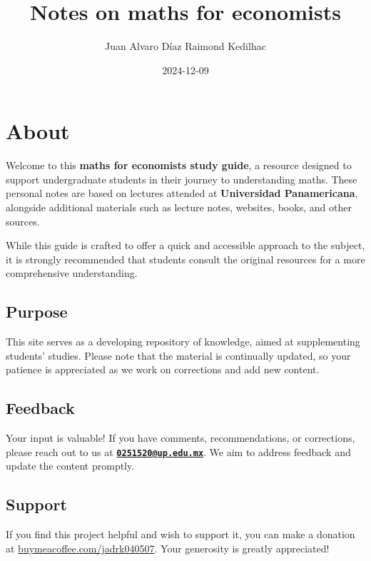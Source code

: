 \documentclass[
]{book}
\title{Notes on maths for economists}
\author{Juan Alvaro Díaz Raimond Kedilhac}
\date{2024-12-09}
\theoremstyle{definition}
\theoremstyle{definition}
\theoremstyle{definition}
\theoremstyle{definition}
\theoremstyle{remark}
\begin{document}
\maketitle

{
\setcounter{tocdepth}{1}
\tableofcontents
}
\hypertarget{about}{%
\chapter{About}\label{about}}

Welcome to this \textbf{maths for economists study guide}, a resource designed to support undergraduate students in their journey to understanding maths. These personal notes are based on lectures attended at \textbf{Universidad Panamericana}, alongside additional materials such as lecture notes, websites, books, and other sources.

While this guide is crafted to offer a quick and accessible approach to the subject, it is strongly recommended that students consult the original resources for a more comprehensive understanding.

\hypertarget{purpose}{%
\section{Purpose}\label{purpose}}

This site serves as a developing repository of knowledge, aimed at supplementing students' studies. Please note that the material is continually updated, so your patience is appreciated as we work on corrections and add new content.

\hypertarget{feedback}{%
\section{Feedback}\label{feedback}}

Your input is valuable! If you have comments, recommendations, or corrections, please reach out to us at \textbf{\href{mailto:0251520@up.edu.mx}{\nolinkurl{0251520@up.edu.mx}}}. We aim to address feedback and update the content promptly.

\hypertarget{support}{%
\section{Support}\label{support}}

If you find this project helpful and wish to support it, you can make a donation at \href{https://buymeacoffee.com/jadrk040507}{buymeacoffee.com/jadrk040507}. Your generosity is greatly appreciated!
\end{document}
